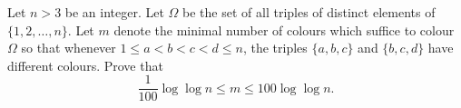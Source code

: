 Let \(n>3\) be an integer. Let \(\Omega\) be the set of all triples of distinct elements of \(\{1,2,\ldots,n\}\). Let \(m\) denote the minimal number of colours which suffice to colour \(\Omega\) so that whenever \(1\le a<b<c<d\le n\), the triples \(\{a,b,c\}\) and \(\{b,c,d\}\) have different colours. Prove that
\[
\frac{1}{100}\log\log n \le m \le 100\log\log n.
\]
